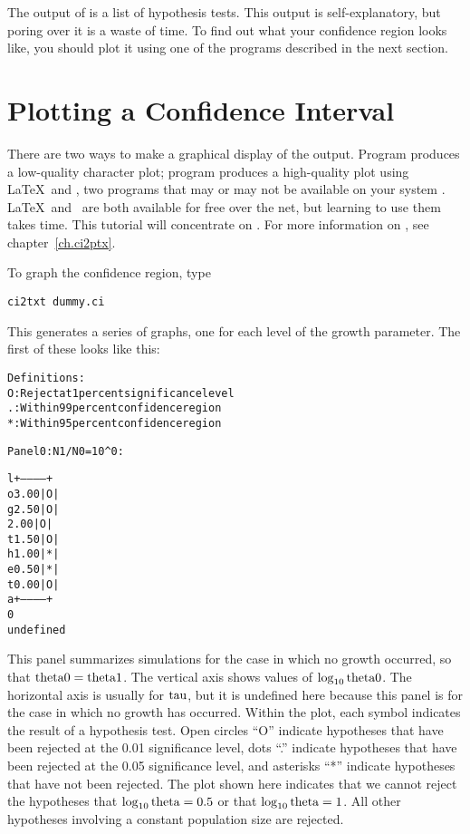 The output of  is a list of hypothesis tests.  This output is
self-explanatory, but poring over it is a waste of time.  To find out
what your confidence region looks like, you should plot it using one
of the programs described in the next section.

\section{Plotting a Confidence Interval}

There are two ways to make a graphical display of the output.  Program
 produces a low-quality character plot; program 
produces a high-quality plot using \LaTeX\ and \PiCTeX, two programs
that may or may not be available on your system
\cite{Lamport:LDP-94,Wichura:PM-87}.  \LaTeX\ and \PiCTeX\ are both
available for free over the net, but learning to use them takes time.
This tutorial will concentrate on .  For more information
on , see chapter~\ref{ch.ci2ptx}.

To graph the confidence region, type 
\begin{verbatim}
ci2txt dummy.ci
\end{verbatim}
This generates a series of graphs, one for each level of the growth
parameter.  The first of these looks like this:
\begin{alltt}
\begin{minipage}{\textwidth}
Definitions:
 O : Reject at 1 percent significance level
 . : Within 99 percent confidence region
 * : Within 95 percent confidence region


Panel 0: N1/N0 = 10^0:

l          +-----------+
o    3.00  |      O    |
g    2.50  |      O    |
     2.00  |      O    |
t    1.50  |      O    |
h    1.00  |      *    |
e    0.50  |      *    |
t    0.00  |      O    |
a          +-----------+
0                       
              undefined 
\end{minipage}
\end{alltt}
This panel summarizes simulations for the case in which no growth
occurred, so that $\hbox{theta0} = \hbox{theta1}$.  The vertical axis shows values
of $\log_{10} \hbox{theta0}$.  The horizontal axis is usually for $\hbox{tau}$, but it
is undefined here because this panel is for the case in which no
growth has occurred.  Within the plot, each symbol indicates the
result of a hypothesis test.  Open circles ``O'' indicate hypotheses
that have been rejected at the 0.01 significance level, dots ``.''
indicate hypotheses that have been rejected at the 0.05 significance
level, and asterisks ``*'' indicate hypotheses that have not been
rejected.   The plot shown here indicates that we cannot reject the
hypotheses that $\log_{10} \hbox{theta} = 0.5$ or that $\log_{10} \hbox{theta} = 1$.  All
other hypotheses involving a constant population size are rejected.

